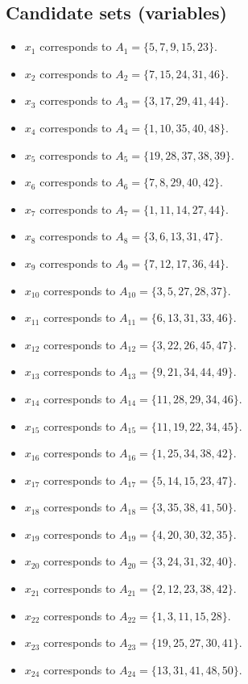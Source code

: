 \documentclass[11pt]{article}
\begin{document}
\subsection*{Candidate sets (variables)}
\begin{itemize}
\item $x_{1}$ corresponds to $A_{1}=\{5, 7, 9, 15, 23\}$.
\item $x_{2}$ corresponds to $A_{2}=\{7, 15, 24, 31, 46\}$.
\item $x_{3}$ corresponds to $A_{3}=\{3, 17, 29, 41, 44\}$.
\item $x_{4}$ corresponds to $A_{4}=\{1, 10, 35, 40, 48\}$.
\item $x_{5}$ corresponds to $A_{5}=\{19, 28, 37, 38, 39\}$.
\item $x_{6}$ corresponds to $A_{6}=\{7, 8, 29, 40, 42\}$.
\item $x_{7}$ corresponds to $A_{7}=\{1, 11, 14, 27, 44\}$.
\item $x_{8}$ corresponds to $A_{8}=\{3, 6, 13, 31, 47\}$.
\item $x_{9}$ corresponds to $A_{9}=\{7, 12, 17, 36, 44\}$.
\item $x_{10}$ corresponds to $A_{10}=\{3, 5, 27, 28, 37\}$.
\item $x_{11}$ corresponds to $A_{11}=\{6, 13, 31, 33, 46\}$.
\item $x_{12}$ corresponds to $A_{12}=\{3, 22, 26, 45, 47\}$.
\item $x_{13}$ corresponds to $A_{13}=\{9, 21, 34, 44, 49\}$.
\item $x_{14}$ corresponds to $A_{14}=\{11, 28, 29, 34, 46\}$.
\item $x_{15}$ corresponds to $A_{15}=\{11, 19, 22, 34, 45\}$.
\item $x_{16}$ corresponds to $A_{16}=\{1, 25, 34, 38, 42\}$.
\item $x_{17}$ corresponds to $A_{17}=\{5, 14, 15, 23, 47\}$.
\item $x_{18}$ corresponds to $A_{18}=\{3, 35, 38, 41, 50\}$.
\item $x_{19}$ corresponds to $A_{19}=\{4, 20, 30, 32, 35\}$.
\item $x_{20}$ corresponds to $A_{20}=\{3, 24, 31, 32, 40\}$.
\item $x_{21}$ corresponds to $A_{21}=\{2, 12, 23, 38, 42\}$.
\item $x_{22}$ corresponds to $A_{22}=\{1, 3, 11, 15, 28\}$.
\item $x_{23}$ corresponds to $A_{23}=\{19, 25, 27, 30, 41\}$.
\item $x_{24}$ corresponds to $A_{24}=\{13, 31, 41, 48, 50\}$.

\end{itemize}
\end{document}
